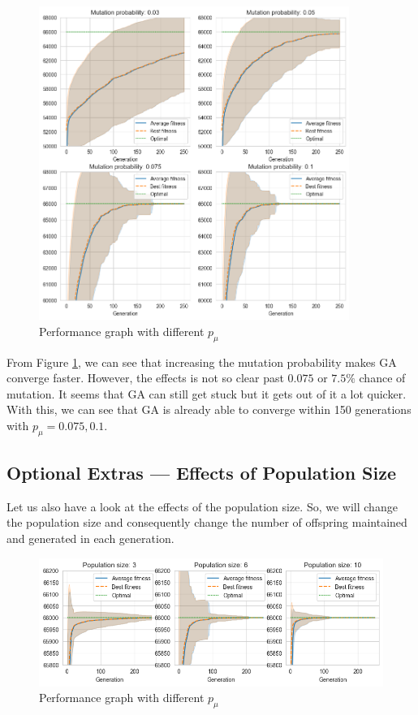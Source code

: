 \begin{figure}[ht]
    \centering
    \includegraphics[width=0.9\textwidth]{../images/p2/part5.png}
    \caption{Performance graph with different \(p_\mu\)}
    \label{fig:p4-5}
\end{figure}

From Figure \ref{fig:p4-5}, we can see that increasing the mutation probability makes GA converge faster. However, the effects is not so clear past \(0.075\) or \(7.5\%\) chance of mutation. It seems that GA can still get stuck but it gets out of it a lot quicker. With this, we can see that GA is already able to converge within 150 generations with \(p_\mu = 0.075, 0.1\).

\subsection{Optional Extras --- Effects of Population Size}

Let us also have a look at the effects of the population size. So, we will change the population size and consequently change the number of offspring maintained and generated in each generation.

\begin{figure}[ht]
    \centering
    \includegraphics[width=\textwidth]{../images/p2/part6.png}
    \caption{Performance graph with different \(p_\mu\)}
    \label{fig:p4-6}
\end{figure}

